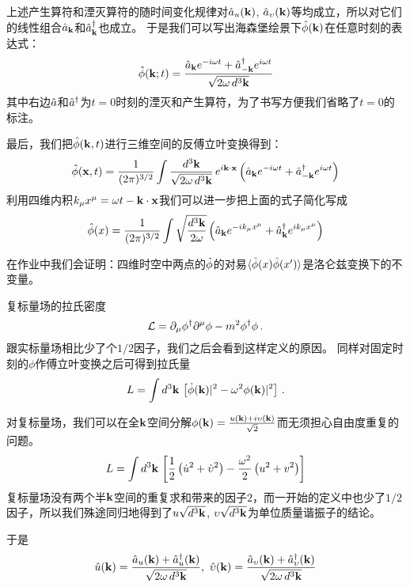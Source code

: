 \documentclass[CJK]{beamer}
\begin{document}
\begin{frame}
\bch
上述产生算符和湮灭算符的随时间变化规律对$\hat{a}_u({\mathbf{k}})$, $\hat{a}_\upsilon({\mathbf{k}})$等均成立，所以对它们的线性组合$\hat{a}_{{\mathbf{k}}}$和${\hat{a}^\dagger}_{{\mathbf{k}}}$也成立。
于是我们可以写出海森堡绘景下$\hat{\phi}({\mathbf{k}})$在任意时刻的表达式：
$$\hat{\phi}({\mathbf{k}}; t) = \frac{\hat{a}_{{\mathbf{k}}}e^{-i\omega t} +{\hat{a}^\dagger}_{-{\mathbf{k}}}e^{i\omega t}}{\sqrt{2\omega\, d^3{\mathbf{k}}}}$$
其中右边$\hat{a}$和${\hat{a}^\dagger}$为$t=0$时刻的湮灭和产生算符，为了书写方便我们省略了$t=0$的标注。
\ech
\end{frame}

\begin{frame}
\bch
最后，我们把$\hat{\phi}({\mathbf{k}}, t)$进行三维空间的反傅立叶变换得到：
$$\hat{\phi}({\mathbf{x}}, t) = \frac{1}{(2\pi)^{3/2}}\int \frac{d^3{\mathbf{k}}}{\sqrt{2\omega\, d^3{\mathbf{k}}}} \, e^{i{\mathbf{k}}\cdot{\mathbf{x}}}\left(\hat{a}_{{\mathbf{k}}}e^{-i\omega t} +{\hat{a}^\dagger}_{-{\mathbf{k}}}e^{i\omega t}\right)$$
利用四维内积$k_\mu x^\mu = \omega t - {\mathbf{k}}\cdot {\mathbf{x}}$我们可以进一步把上面的式子简化写成
$$\hat{\phi}(x) = \frac{1}{(2\pi)^{3/2}} \int \sqrt{\frac{d^3{\mathbf{k}}}{2\omega}} \left(\hat{a}_{{\mathbf{k}}} e^{-ik_\mu x^\mu} + {\hat{a}^\dagger}_{{\mathbf{k}}}e^{ik_\mu x^\mu}\right) $$

\skipline
在作业中我们会证明：四维时空中两点的$\hat{\phi}$的对易$\langle \hat{\phi}(x)\hat{\phi}(x') \rangle$是洛仑兹变换下的不变量。
\ech
\end{frame}


\begin{frame}
\bch
复标量场的拉氏密度
$${\mathcal{L}} = \partial_\mu\phi^\dagger \partial^\mu \phi - m^2\phi^\dagger\phi\, .$$
跟实标量场相比少了个$1/2$因子，我们之后会看到这样定义的原因。
\skipline
同样对固定时刻的$\phi$作傅立叶变换之后可得到拉氏量
$$L = \int d^3{\mathbf{k}} \, \left[\dot\phi({\mathbf{k}})|^2 - \omega^2\phi({\mathbf{k}})|^2 \right]\, .$$
\ech
\end{frame}


\begin{frame}
\bch
对复标量场，我们可以在全${\mathbf{k}}$空间分解$\phi({\mathbf{k}}) = \frac{u({\mathbf{k}}) + i \upsilon({\mathbf{k}})}{\sqrt{2}}$而无须担心自由度重复的问题。
$$L = \int d^3{\mathbf{k}}\,\left[ \frac{1}{2}\left(\dot u^2 + \dot {\upsilon}^2 \right) - \frac{\omega^2}{2}\left(u^2+v^2\right)\right]$$
复标量场没有两个半${\mathbf{k}}$空间的重复求和带来的因子$2$，而一开始的定义中也少了$1/2$因子，所以我们殊途同归地得到了$u\sqrt{d^3{\mathbf{k}}}$, $\upsilon\sqrt{d^3{\mathbf{k}}}$为单位质量谐振子的结论。

于是
$$\hat{u}(\veck)  = \frac{\hata_u(\veck) + \adag_u(\veck)}{\sqrt{2\omega\, d^3\veck}},\ \hat{\vel}(\veck)  = \frac{\hata_{\vel}(\veck) + \adag_{\vel}(\veck)}{\sqrt{2\omega\, d^3\veck}}$$

\ech
\end{frame}
\end{document}
